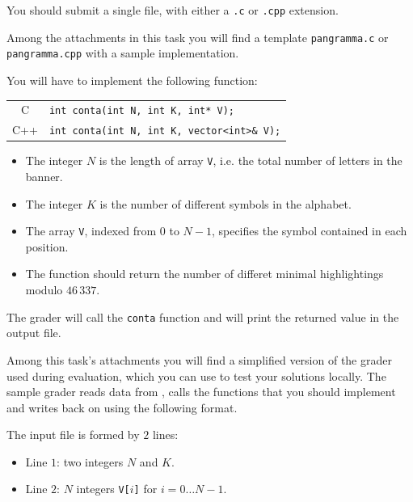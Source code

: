 You should submit a single file, with either a \texttt{.c} or \texttt{.cpp}
extension.

\begin{warning}
Among the attachments in this task you will find a template \texttt{pangramma.c}
or \texttt{pangramma.cpp} with a sample implementation.
\end{warning}

You will have to implement the following function:

\begin{center}\begin{tabularx}{\textwidth}{|c|X|}
\hline
C    & \verb|int conta(int N, int K, int* V);|\\
C++  & \verb|int conta(int N, int K, vector<int>& V);|\\
\hline
\end{tabularx}\end{center}

\begin{itemize}[nolistsep]
  \item The integer $N$ is the length of array \texttt{V}, i.e. the total number
        of letters in the banner.
  \item The integer $K$ is the number of different symbols in the alphabet.
  \item The array \texttt{V}, indexed from $0$ to $N-1$, specifies the symbol
        contained in each position.
  \item The function should return the number of differet minimal highlightings
        modulo $46\,337$.
\end{itemize}

\medskip

The grader will call the \texttt{conta} function and will print the returned
value in the output file.



\Grader

Among this task's attachments you will find a simplified version of the grader
used during evaluation, which you can use to test your solutions locally. The
sample grader reads data from , calls the functions that you should
implement and writes back on \outputfile{} using the following format.

The input file is formed by $2$ lines:
\begin{itemize}[nolistsep,itemsep=2mm]
\item Line $1$: two integers $N$ and $K$.
\item Line $2$: $N$ integers \texttt{V[$i$]} for $i = 0\ldots N-1$.
\end{itemize}

